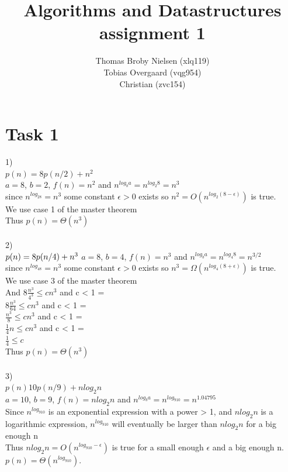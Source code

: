 \documentclass[12pt]{article}
\title{Algorithms and Datastructures assignment 1}
\author{Thomas Broby Nielsen (xlq119)\\ Tobias Overgaard (vqg954)\\ Christian (zvc154)}
\begin{document}
\maketitle

\tableofcontents

\pagebreak
\section{Task 1}
1)
\\
$
p(n)=8p(n/2)+n^{2}
$\\
$a=8$, $b=2$, $f(n)=n^{2}$ and $n^{log_{b}a}=n^{log_{2}8}=n^3$\\
since $n^{log_28}=n^3$ some constant $\epsilon > 0 $ exists so $n^2=O(n^{log_2(8-\epsilon)})$ is true.\\ We use case 1 of the master theorem\\
Thus $p(n)=\Theta (n^3)$\\
\\
2)
\\
$p(n)=8p(n/4)+n^{3}\\$
$a=8$, $b=4$, $f(n)=n^{3}$ and $n^{log_{b}a}=n^{log_{4}8}=n^{3/2}$\\
since $n^{log_48}=n^3$ some constant $\epsilon > 0$ exists so $n^3=\Omega(n^{log_4(8+\epsilon)})$  is true.\\ We use case 3 of the master theorem\\
And $8 \frac {n^3}{4^3} \leq cn^3$ and c < 1 =\\
 $8 \frac {n^3}{64} \leq cn^3$ and c < 1 =\\
 $ \frac {n^3}{8} \leq cn^3$ and c < 1 =\\
 $ \frac {1}{4}n \leq cn^3$ and c < 1 =\\
 $  \frac {1}{4} \leq c$\\
Thus $p(n)=\Theta(n^3)$\\
\\
3)
\\
$p(n)10p(n/9)+nlog_2n$
\\
$a=10$, $b=9$, $f(n)=nlog_2n$ and $n^{log_{b}a}=n^{log_910}=n^{1.04795}$
\\
Since $n^{log_910}$ is an exponential expression with a power > 1, and $n log_2 n$ is a logarithmic expression, $n^{log_910}$ will eventually be larger than $n log_2 n$ for a big enough n
\\
Thus $n log_2 n = O(n^{log_910-\epsilon})$ is true for a small enough $\epsilon$ and a big enough n.
$p(n)=\Theta (n^{log_910}).$
\newpage
\end{document}
